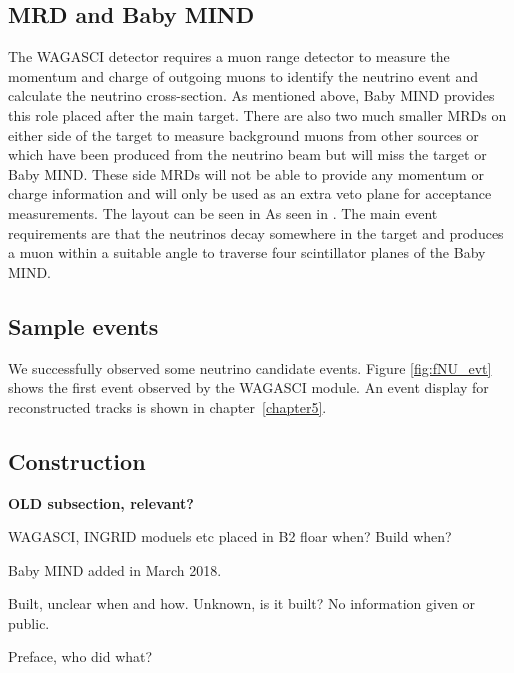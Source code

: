 \subsection{MRD and Baby MIND}
The WAGASCI detector requires a muon range detector to measure the momentum and charge of outgoing muons to identify the neutrino event and calculate the neutrino cross-section. As mentioned above, Baby MIND provides this role placed after the main target. There are also two much smaller MRDs on either side of the target to measure background muons from other sources or which have been produced from the neutrino beam but will miss the target or Baby MIND. These side MRDs will not be able to provide any momentum or charge information and will only be used as an extra veto plane for acceptance measurements. The layout can be seen in As seen in . The main event requirements are that the neutrinos decay somewhere in the target and produces a muon within a suitable angle to traverse four scintillator planes of the Baby MIND.

\subsection{Sample events}

We successfully observed some neutrino candidate events. Figure \ref{fig:fNU_evt} shows the first event observed by the WAGASCI module. An event display for reconstructed tracks is shown in chapter~\ref{chapter5}.


\subsection{Construction}

\textbf{OLD subsection, relevant?}

WAGASCI, INGRID moduels etc placed in B2 floar when? Build when?

Baby MIND added in March 2018.

Built, unclear when and how.
Unknown, is it built? No information given or public.

Preface, who did what?


\fi

